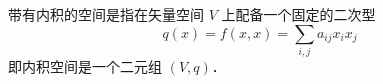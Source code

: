 
带有内积的空间是指在矢量空间 $V$ 上配备一个固定的二次型
\begin{equation}
q(x)=f(x,x)=\sum_{i,j}a_{ij}x_ix_j
\end{equation}
 即内积空间是一个二元组 $(V,q)$．